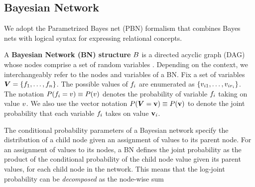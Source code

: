  	
 	\subsection{Bayesian Network}
 	We adopt  
 	the Parametrized Bayes net (PBN) formalism \cite{Poole2003} that combines Bayes nets with logical syntax for expressing relational concepts. 
 	
 	
 	
 	A {\bf Bayesian Network (BN) structure} $B$ is a directed acyclic graph (DAG)  whose nodes comprise a set of random variables \cite{Pearl1988}. Depending on the context, we interchangeably refer to the nodes  and variables of a BN. Fix a set of variables $\boldsymbol{V} = \{f_{1},\ldots,f_{n}\}$. 
 	The possible values of $f_{i}$ are enumerated as $\{v_{i1},\ldots,v_{ir_{i}}\}$. The notation $P(f_{i} = v)\equiv P(v)$ denotes the probability of variable $f_{i}$ taking on value $v$. We also use the vector notation $P(\boldsymbol{V} = \mathbf{v}) \equiv P(\mathbf{v})$ to denote the joint probability that each variable $f_{i}$ takes on value $\mathbf{v}_{i}$. 
 	
 	
 	The conditional probability parameters of a Bayesian network specify the distribution of a child node given an assignment of values to its parent node. For an assignment of values to its nodes, a BN defines the joint probability as the product of the conditional probability of the child node value given its parent values, for each child node in the network. This means that the log-joint probability can be {\em decomposed} as the node-wise sum
 	
